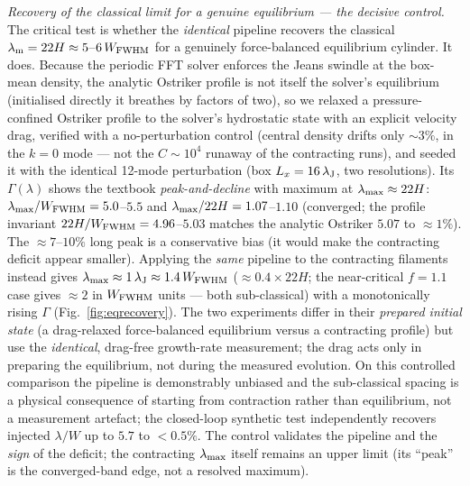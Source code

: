 \documentclass[usenatbib,twoside,twocolumn]{mnras}
\begin{document}
\emph{Recovery of the classical limit for a genuine equilibrium --- the decisive control.} The critical test is whether the \emph{identical} pipeline recovers the classical $\lambda_{\rm m}=22H\approx5$--$6\,W_{\rm FWHM}$ for a genuinely force-balanced equilibrium cylinder. It does. Because the periodic FFT solver enforces the Jeans swindle at the box-mean density, the analytic Ostriker profile is not itself the solver's equilibrium (initialised directly it breathes by factors of two), so we relaxed a pressure-confined Ostriker profile to the solver's hydrostatic state with an explicit velocity drag, verified with a no-perturbation control (central density drifts only $\sim3\%$, in the $k=0$ mode --- not the $C\sim10^4$ runaway of the contracting runs), and seeded it with the identical 12-mode perturbation (box $L_x=16\,\lambda_{\rm J}$, two resolutions). Its $\Gamma(\lambda)$ shows the textbook \emph{peak-and-decline} with maximum at $\lambda_{\rm max}\approx22H$: $\lambda_{\rm max}/W_{\rm FWHM}=5.0$--$5.5$ and $\lambda_{\rm max}/22H=1.07$--$1.10$ (converged; the profile invariant $22H/W_{\rm FWHM}=4.96$--$5.03$ matches the analytic Ostriker $5.07$ to $\approx1\%$). The $\approx7$--$10\%$ long peak is a conservative bias (it would make the contracting deficit appear smaller). Applying the \emph{same} pipeline to the contracting filaments instead gives $\lambda_{\rm max}\approx1\,\lambda_{\rm J}\approx1.4\,W_{\rm FWHM}$ ($\approx0.4\times22H$; the near-critical $f=1.1$ case gives $\approx2$ in $W_{\rm FWHM}$ units --- both sub-classical) with a monotonically rising $\Gamma$ (Fig.~\ref{fig:eqrecovery}). The two experiments differ in their \emph{prepared initial state} (a drag-relaxed force-balanced equilibrium versus a contracting profile) but use the \emph{identical}, drag-free growth-rate measurement; the drag acts only in preparing the equilibrium, not during the measured evolution. On this controlled comparison the pipeline is demonstrably unbiased and the sub-classical spacing is a physical consequence of starting from contraction rather than equilibrium, not a measurement artefact; the closed-loop synthetic test independently recovers injected $\lambda/W$ up to $5.7$ to $<0.5\%$. The control validates the pipeline and the \emph{sign} of the deficit; the contracting $\lambda_{\rm max}$ itself remains an upper limit (its ``peak'' is the converged-band edge, not a resolved maximum).
\end{document}
